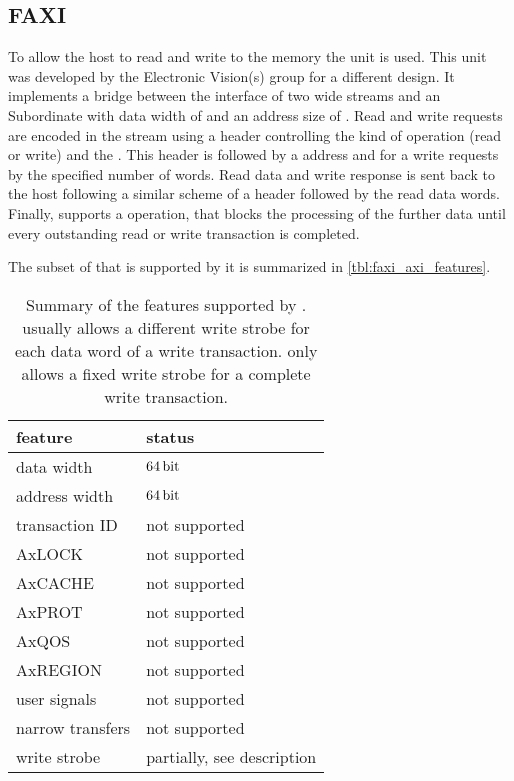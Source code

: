 \subsection{FAXI}
To allow the host to read and write to the \DDR{} memory the \FAXI{} unit is used. This unit was developed by the Electronic Vision(s) group for a different \FPGA{} design. It implements a bridge between the \HostARQ{} \FPGA{} interface of two \PhyWordSize{} wide streams and an \AXI{} Subordinate with data width of \PhyWordSize{} and an address size of \PhyWordSize{}.
Read and write requests are encoded in the \HostARQ{} stream using a \PhyWordSize{} header controlling the kind of operation (read or write) and the \burstsize{}. This header is followed by a \PhyWordSize{} address and for a write requests by the specified number of \PhyWordSize{} words.
Read data and write response is sent back to the host following a similar scheme of a \PhyWordSize{} header followed by the read data words.
Finally, \FAXI{} supports a \globalfence{} operation, that blocks the processing of the further data until every outstanding read or write transaction is completed.

The subset of \AXI{} that is supported by it is summarized in \autoref{tbl:faxi_axi_features}.

\begin{table}
  \begin{center}
\begin{tabular}{ll}
  \toprule
  feature & status  \\
  \midrule
  data width & $\SI{64}{\bit}$ \\
  address width & $\SI{64}{\bit}$ \\
  transaction ID & not supported \\
  AxLOCK & not supported \\
  AxCACHE & not supported \\
  AxPROT & not supported \\
  AxQOS & not supported \\
  AxREGION & not supported \\
  user signals & not supported \\
  narrow transfers & not supported \\
  write strobe & partially, see description \\
  \bottomrule
\end{tabular}

  \end{center}
\caption{Summary of the \AXI{} features supported by \FAXI{}. \AXI{} usually allows a different write strobe for each data word of a write transaction. \FAXI{} only allows a fixed write strobe for a complete write transaction.}\label{tbl:faxi_axi_features}
\end{table}

